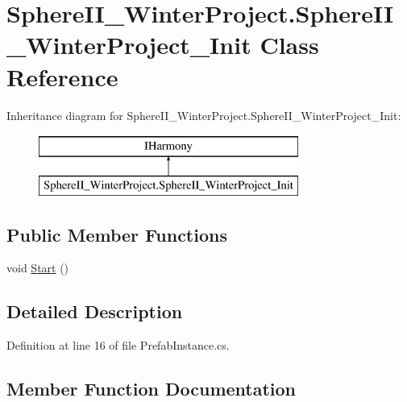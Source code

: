 \hypertarget{class_sphere_i_i___winter_project_1_1_sphere_i_i___winter_project___init}{}\section{Sphere\+I\+I\+\_\+\+Winter\+Project.\+Sphere\+I\+I\+\_\+\+Winter\+Project\+\_\+\+Init Class Reference}
\label{class_sphere_i_i___winter_project_1_1_sphere_i_i___winter_project___init}
Inheritance diagram for Sphere\+I\+I\+\_\+\+Winter\+Project.\+Sphere\+I\+I\+\_\+\+Winter\+Project\+\_\+\+Init\+:\begin{figure}[H]
\begin{center}
\leavevmode
\includegraphics[height=2.000000cm]{d4/d7b/class_sphere_i_i___winter_project_1_1_sphere_i_i___winter_project___init}
\end{center}
\end{figure}
\subsection*{Public Member Functions}
\begin{DoxyCompactItemize}
\item 
void \mbox{\hyperlink{class_sphere_i_i___winter_project_1_1_sphere_i_i___winter_project___init_a45c25ac266897ab32099235e37f2a526}{Start}} ()
\end{DoxyCompactItemize}


\subsection{Detailed Description}


Definition at line 16 of file Prefab\+Instance.\+cs.



\subsection{Member Function Documentation}
\mbox{\label{class_sphere_i_i___winter_project_1_1_sphere_i_i___winter_project___init_a45c25ac266897ab32099235e37f2a526}} 
